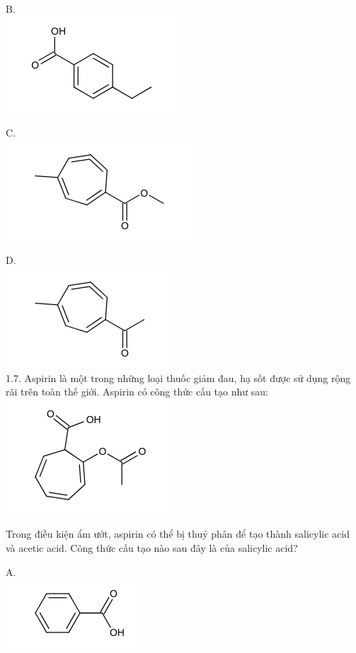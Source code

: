\documentclass[10pt]{article}
\begin{document}
B.\\
\includegraphics{smile-3fea05a2e410e6df96031cb05f3a10adf5b3790c}

C.\\
\includegraphics{smile-069c43fd1d84552383f4670fe7f7e3bacd6b8ae1}

D.\\
\includegraphics{smile-6cae12455a4cc6a2def442f07a3d18c73b9ae39d}\\
1.7. Aspirin là một trong những loại thuốc giảm đau, hạ sốt được sử dụng rộng rãi trên toàn thế giới. Aspirin có công thức cấu tạo như sau:\\
\includegraphics{smile-d4a2c4ee4a4bcf2ae9fa5567446cb7850b8b720e}

Trong điều kiện ẩm ướt, aspirin có thể bị thuỷ phân để tạo thành salicylic acid và acetic acid. Công thức cấu tạo nào sau đây là của salicylic acid?

A.\\
\includegraphics{smile-2ae7efd825bcf4e7cab6714b5e0d54942c742e9e}
\end{document}
